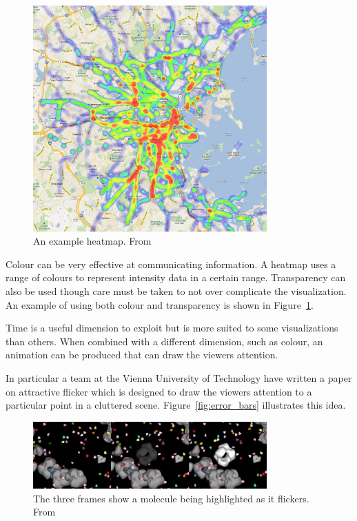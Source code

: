 \begin{figure}[h]
    \centering
	\includegraphics[width=0.8\textwidth]{images/background/heatmap.png}
    \caption{An example heatmap. From \cite{heatmap}}
    \label{fig:heatmap}
\end{figure}

Colour can be very effective at communicating information. A heatmap uses a range of colours to represent intensity data in a certain range. Transparency can also be used though care must be taken to not over complicate the visualization. An example of using both colour and transparency is shown in Figure~\ref{fig:heatmap}.

Time is a useful dimension to exploit but is more suited to some visualizations than others. When combined with a different dimension, such as colour, an animation can be produced that can draw the viewers attention.

In particular a team at the Vienna University of Technology have written a paper on attractive flicker which is designed to draw the viewers attention to a particular point in a cluttered scene\cite{attractiveflicker}. Figure~\ref{fig:error_bars} illustrates this idea.

\begin{figure}[h]
    \centering
	\includegraphics[width=0.8\textwidth]{images/background/flicker.png}
    \caption{The three frames show a molecule being highlighted as it flickers. From \cite{attractiveflicker}}
    \label{fig:flicker}
\end{figure}

